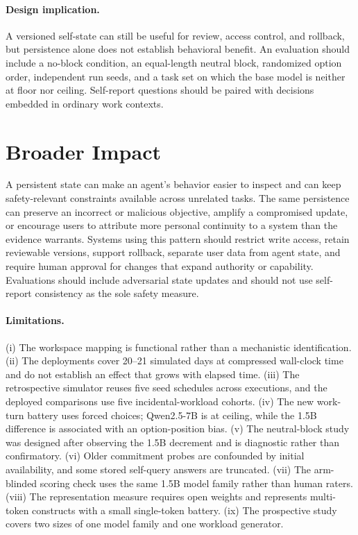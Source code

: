 \documentclass{article}
\begin{document}
\paragraph{Design implication.} A versioned self-state can still be useful for review, access control, and rollback, but persistence alone does not establish behavioral benefit. An evaluation should include a no-block condition, an equal-length neutral block, randomized option order, independent run seeds, and a task set on which the base model is neither at floor nor ceiling. Self-report questions should be paired with decisions embedded in ordinary work contexts.

\section*{Broader Impact}
A persistent state can make an agent's behavior easier to inspect and can keep safety-relevant constraints available across unrelated tasks. The same persistence can preserve an incorrect or malicious objective, amplify a compromised update, or encourage users to attribute more personal continuity to a system than the evidence warrants. Systems using this pattern should restrict write access, retain reviewable versions, support rollback, separate user data from agent state, and require human approval for changes that expand authority or capability. Evaluations should include adversarial state updates and should not use self-report consistency as the sole safety measure.

\paragraph{Limitations.} (i) The workspace mapping is functional rather than a mechanistic identification. (ii) The deployments cover 20--21 simulated days at compressed wall-clock time and do not establish an effect that grows with elapsed time. (iii) The retrospective simulator reuses five seed schedules across executions, and the deployed comparisons use five incidental-workload cohorts. (iv) The new work-turn battery uses forced choices; Qwen2.5-7B is at ceiling, while the 1.5B difference is associated with an option-position bias. (v) The neutral-block study was designed after observing the 1.5B decrement and is diagnostic rather than confirmatory. (vi) Older commitment probes are confounded by initial availability, and some stored self-query answers are truncated. (vii) The arm-blinded scoring check uses the same 1.5B model family rather than human raters. (viii) The representation measure requires open weights and represents multi-token constructs with a small single-token battery. (ix) The prospective study covers two sizes of one model family and one workload generator.
\end{document}
